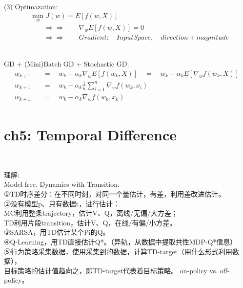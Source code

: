 \documentclass{article}
\begin{document}
~ \\[3pt]
(3) Optimazation: 
\begin{align*}
    & \min_{w} J(w) = E \left[ f(w, X) \right] \\[3pt]
    & \qquad \Rightarrow \Rightarrow \qquad 
    \nabla_{w} E \left[ f(w, X) \right] = 0 \\[3pt]
    & \qquad \Rightarrow \Rightarrow \qquad 
    Gradient: \quad InputSpace, \quad direction + magnitude 
\end{align*}


~ \\[3pt]
GD \quad + \quad (Mini)Batch GD \quad + \quad Stochastic GD: 
\begin{align*}
    w_{k+1} & 
            \quad = \quad w_{k} - \alpha_{k} 
            \nabla_{w} E \left[ f(w_{k}, X) \right] 
            \quad = \quad w_{k} - \alpha_{k} 
            E \left[ \nabla_{w} f(w_{k}, X) \right] \\[3pt]
    w_{k+1} & 
            \quad = \quad w_{k} - \alpha_{k} 
            \frac {1} {n} \sum_{i=1}^{n} 
            \nabla_{w} f(w_{k}, x_{i}) \\[3pt]
    w_{k+1} & 
            \quad = \quad w_{k} - \alpha_{k} 
            \nabla_{w} f(w_{k}, x_{k}) \\[3pt]
\end{align*}


\newpage
\section*{ch5: Temporal Difference}


~ \\[3pt]
\begin{CJK}{UTF8}{gbsn}
    理解: \\[3pt]
    Model-free. Dynamics with Transition. \\[3pt]
    ①TD时序差分：在不同时刻，对同一个量估计，有差，利用差改进估计。 \\[3pt]
    ②没有模型p、只有数据t，进行估计： \\[3pt]
    MC利用整条trajectory，估计V、Q，离线/无偏/大方差； \\[3pt]
    TD利用片段transition，估计V、Q，在线/有偏/小方差。 \\[3pt]
    ③SARSA，用TD估计某个Pi的Q。 \\[3pt]
    ④Q-Learning，用TD直接估计Q*。（异轨，从数据中提取共性MDP-Q*信息） \\[3pt]
    ⑤行为策略采集数据，使用采集到的数据，计算TD-target（用什么形式利用数据）， \\[3pt]
    目标策略的估计值趋向之，即TD-target代表着目标策略。 
    on-policy vs. off-policy。 \\[3pt]
\end{CJK}
\end{document}
